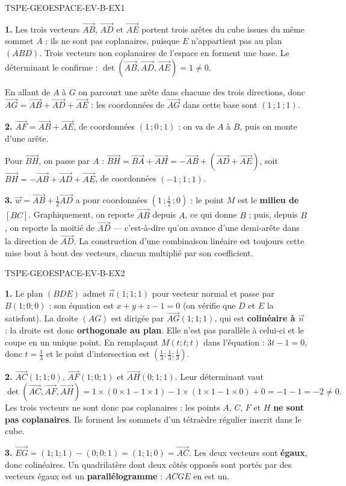 \begin{corrige}{TSPE-GEOESPACE-EV-B-EX1}

\textbf{1.} Les trois vecteurs $\vec{AB}$, $\vec{AD}$ et $\vec{AE}$ portent trois arêtes
du cube issues du même sommet $A$ : ils ne sont pas coplanaires, puisque $E$ n'appartient
pas au plan $(ABD)$. Trois vecteurs non coplanaires de l'espace en forment une base. Le
déterminant le confirme : $\det\left(\vec{AB},\vec{AD},\vec{AE}\right)=1\neq0$.

En allant de $A$ à $G$ on parcourt une arête dans chacune des trois directions, donc
$\vec{AG}=\vec{AB}+\vec{AD}+\vec{AE}$ : les coordonnées de $\vec{AG}$ dans cette base sont
$(1\,;1\,;1)$.

\textbf{2.} $\vec{AF}=\vec{AB}+\vec{AE}$, de coordonnées $(1\,;0\,;1)$ : on va de $A$ à $B$,
puis on monte d'une arête.

Pour $\vec{BH}$, on passe par $A$ : $\vec{BH}=\vec{BA}+\vec{AH}=-\vec{AB}+\left(\vec{AD}+\vec{AE}\right)$,
soit $\vec{BH}=-\vec{AB}+\vec{AD}+\vec{AE}$, de coordonnées $(-1\,;1\,;1)$.

\textbf{3.} $\vec{w}=\vec{AB}+\tfrac12\vec{AD}$ a pour coordonnées
$\left(1\,;\tfrac12\,;0\right)$ : le point $M$ est le \textbf{milieu de $[BC]$}.
Graphiquement, on reporte $\vec{AB}$ depuis $A$, ce qui donne $B$ ; puis, depuis $B$, on
reporte la moitié de $\vec{AD}$ — c'est-à-dire qu'on avance d'une demi-arête dans la
direction de $\vec{AD}$. La construction d'une combinaison linéaire est toujours cette mise
bout à bout des vecteurs, chacun multiplié par son coefficient.

\end{corrige}

\begin{corrige}{TSPE-GEOESPACE-EV-B-EX2}

\textbf{1.} Le plan $(BDE)$ admet $\vec{n}(1;1;1)$ pour vecteur normal et passe par
$B(1;0;0)$ : son équation est $x+y+z-1=0$ (on vérifie que $D$ et $E$ la satisfont).
La droite $(AG)$ est dirigée par $\vec{AG}(1;1;1)$, qui est \textbf{colinéaire à $\vec{n}$} :
la droite est donc \textbf{orthogonale au plan}. Elle n'est pas parallèle à celui-ci et le
coupe en un unique point. En remplaçant $M(t;t;t)$ dans l'équation : $3t-1=0$, donc
$t=\tfrac13$ et le point d'intersection est $\left(\tfrac13;\tfrac13;\tfrac13\right)$.

\textbf{2.} $\vec{AC}(1;1;0)$, $\vec{AF}(1;0;1)$ et $\vec{AH}(0;1;1)$. Leur déterminant vaut
\[
  \det\left(\vec{AC},\vec{AF},\vec{AH}\right)
  = 1\times(0\times1-1\times1) - 1\times(1\times1-1\times0) + 0
  = -1-1 = -2 \neq 0 .
\]
Les trois vecteurs ne sont donc pas coplanaires : les points $A$, $C$, $F$ et $H$
\textbf{ne sont pas coplanaires}. Ils forment les sommets d'un tétraèdre régulier inscrit
dans le cube.

\textbf{3.} $\vec{EG}=(1;1;1)-(0;0;1)=(1;1;0)=\vec{AC}$. Les deux vecteurs sont
\textbf{égaux}, donc colinéaires. Un quadrilatère dont deux côtés opposés sont portés par
des vecteurs égaux est un \textbf{parallélogramme} : $ACGE$ en est un.

\end{corrige}

